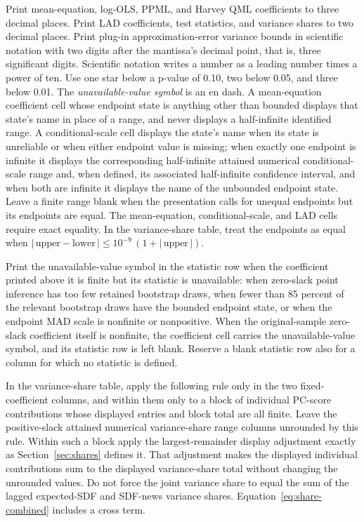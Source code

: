 \documentclass[11pt]{article}
\begin{document}
Print mean-equation, log-OLS, PPML, and Harvey QML coefficients to three decimal places. Print LAD
coefficients, test statistics, and variance shares to two decimal places. Print plug-in
approximation-error variance bounds in scientific notation with two digits after the mantissa's
decimal point, that is, three significant digits. Scientific
notation writes a number as a leading number times a power of ten. Use one star below a p-value of
0.10, two below 0.05, and three below 0.01. The \emph{unavailable-value symbol} is an en
dash. A mean-equation coefficient cell whose endpoint state is anything other than bounded displays
that state's name in place of a range, and never displays a half-infinite identified range. A
conditional-scale cell displays the state's name when its state is unreliable or when either endpoint
value is missing; when exactly one endpoint is infinite it displays the corresponding half-infinite
attained numerical conditional-scale range and, when defined, its associated half-infinite confidence
interval, and when both are infinite it displays the name of the unbounded endpoint state.
Leave a finite range blank when the presentation calls for unequal endpoints but its
endpoints are equal. The mean-equation, conditional-scale, and LAD cells require exact
equality. In the variance-share table, treat the endpoints as equal when
\(|\,\text{upper}-\text{lower}\,|\le10^{-9}\,(1+|\,\text{upper}\,|)\).

Print the unavailable-value symbol in the statistic row when the coefficient printed above it is
finite but its statistic is unavailable: when zero-slack point inference has too few retained
bootstrap draws, when fewer than 85 percent of the relevant bootstrap draws have the bounded endpoint
state, or when the endpoint MAD scale is nonfinite or nonpositive. When the original-sample zero-slack
coefficient itself is nonfinite, the coefficient cell carries the unavailable-value symbol, and its
statistic row is left blank. Reserve a blank statistic row also for a column for which no statistic is defined.

In the variance-share table, apply the following rule only in the two
fixed-coefficient columns, and within them only to a block of individual PC-score contributions whose displayed
entries and block total are all finite. Leave the positive-slack attained numerical variance-share range columns
unrounded by this rule. Within such a block apply the largest-remainder display adjustment exactly as
Section~\ref{sec:shares} defines it. That adjustment makes the displayed individual
contributions sum to the displayed variance-share total without changing the unrounded values. Do not force the joint
variance share to equal the sum of the lagged expected-SDF and SDF-news variance shares.
Equation~\eqref{eq:share-combined} includes a cross term.
\end{document}
